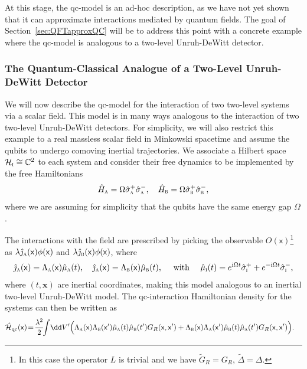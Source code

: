 \documentclass[letterpaper,12pt,titlepage,oneside,final]{book}
\newcommand{\mf}{\mathsf}%
\newcommand{\ii}{\mathrm{i}}
\newcommand{\tc}[1]{\textsc{#1}}
\begin{document}
At this stage, the qc-model is an ad-hoc description, as we have not yet shown that it can approximate interactions mediated by quantum fields. The goal of Section~\ref{sec:QFTapproxQC} will be to address this point with a concrete example where the qc-model is analogous to a two-level Unruh-DeWitt detector.


\subsubsection*{The Quantum-Classical Analogue of a Two-Level Unruh-DeWitt Detector}

We will now describe the qc-model for the interaction of two two-level systems via a scalar field. This model is in many ways analogous to the interaction of two two-level Unruh-DeWitt detectors. For simplicity, we will also restrict this example to a real massless scalar field in Minkowski spacetime and assume the qubits to undergo comoving inertial trajectories. We associate a Hilbert space $\mathcal{H}_\tc{i}\cong  \mathbb{C}^2$ to each system and consider their free dynamics to be implemented by the free Hamiltonians
\begin{equation}
    \hat{H}_\textsc{a} = \Omega \hat{\sigma}^+_\textsc{a}\hat{\sigma}^-_\textsc{a}, \quad 
    \hat{H}_\textsc{b} = \Omega \hat{\sigma}^+_\textsc{b}\hat{\sigma}^-_\textsc{b},
\end{equation}
where we are assuming for simplicity that the qubits have the same energy gap $\Omega$. 

The interactions with the field are prescribed by picking the observable $O(\mf x)$\footnote{In this case the operator $L$ is trivial and we have $\tilde{G}_R = G_R$, $\tilde{\Delta} = \Delta$.} as $\lambda\hat{\jmath}_\tc{a}(\mf x) \phi(\mf x)$ and $\lambda\hat{\jmath}_\tc{b}(\mf x)\phi(\mf x)$, where
\begin{equation}
    \hat{\jmath}_\tc{a}(\mf x) = \Lambda_\tc{a}(\mf x) \hat{\mu}_\tc{a}(t), \quad 
    \hat{\jmath}_\tc{a}(\mf x) = \Lambda_\tc{b}(\mf x) \hat{\mu}_\tc{b}(t), \quad \text{ with } \quad \hat{\mu}_\tc{i}(t) = e^{\ii \Omega t}\hat{\sigma}^+_\tc{i}+e^{-\ii \Omega t}\hat{\sigma}^-_\tc{i},
\end{equation}
where $(t,\bm x)$ are inertial coordinates, making this model analogous to an inertial two-level Unruh-DeWitt model. The qc-interaction Hamiltonian density for the systems can then be written as
\begin{align}\label{eq:classHpointlike}
    \hat{\mathcal{H}}_\text{qc}(\mf x) \!= \!\frac{\lambda^2}{2}\!\!\int &\dd V' \Big(\Lambda_\textsc{a}(\mf x)\Lambda_\textsc{b}(\mf x')\hat{\mu}_\textsc{a}(t)\hat{\mu}_\textsc{b}(t')G_R(\mf x, \mf x')+\Lambda_\textsc{b}(\mf x)\Lambda_\textsc{a}(\mf x')\hat{\mu}_\textsc{b}(t)\hat{\mu}_\textsc{a}(t')G_R(\mf x,\mf x')\Big).
\end{align}
\end{document}
